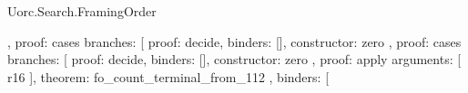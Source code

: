 \begin{lexlean}{Uorc.Search.FramingOrder}
\begin{semanticmodule}
{{{{{{{{{{{{{{{{{{{{{{{{{{{{{                                                                                    },
                                                                                    {
                                                                                      proof: cases{
                                                                                        branches: [
                                                                                          {
                                                                                            proof: decide{},
                                                                                            binders: [],
                                                                                            constructor: zero
                                                                                          },
                                                                                          {
                                                                                            proof: cases{
                                                                                              branches: [
                                                                                                {
                                                                                                  proof: decide{},
                                                                                                  binders: [],
                                                                                                  constructor: zero
                                                                                                },
                                                                                                {
                                                                                                  proof: apply{
                                                                                                    arguments: [
                                                                                                      r16
                                                                                                    ],
                                                                                                    theorem: fo_count_terminal_from_112
                                                                                                  },
                                                                                                  binders: [
}}}}}}}}}}}}}}}}}}}}}}}}}}}}}}}}}
\end{semanticmodule}
\end{lexlean}
